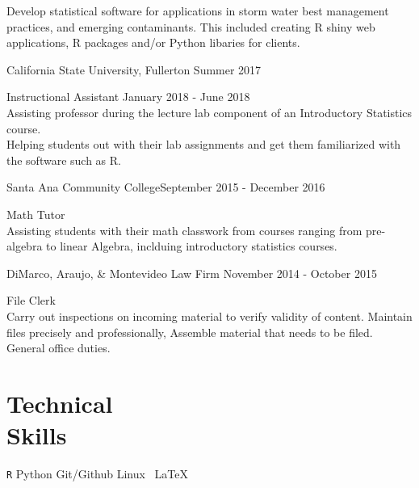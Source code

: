 \documentclass[margin,line]{res}
\newenvironment{list1}{
  \begin{list}{\ding{113}}{
      \setlength{\itemsep}{0in}
      \setlength{\parsep}{0in} \setlength{\parskip}{0in}
      \setlength{\topsep}{0in} \setlength{\partopsep}{0in} 
      \setlength{\leftmargin}{0.20in}}}{\end{list}}
\begin{document}
\begin{resume}
\begin{list1}
Develop statistical software for applications in storm water best management practices, and emerging contaminants. This included creating R shiny web applications, R packages and/or Python libaries for clients.
\end{list1}

{\sc California State University, Fullerton} \hfill {Summer 2017}\\
\vspace*{-.15in}
\begin{list1}
\item[] {\sc Instructional Assistant} \hfill{January 2018 - June 2018} \\
\vskip -6pt
Assisting professor during the lecture lab component of an Introductory Statistics course. \\
Helping students out with their lab assignments and get them familiarized with the software such as R. 

\end{list1}
{\sc Santa Ana Community College}\hfill {September 2015 - December 2016 }\\
\vspace*{-.15in}
\begin{list1}
\item[] {\sc Math Tutor}  \\
\vskip -6pt
Assisting students with their math classwork from courses ranging from pre-algebra to linear Algebra, inclduing introductory statistics courses.
\end{list1}

{\sc DiMarco, Araujo, \& Montevideo Law Firm} \hfill {November 2014 - October 2015}\\
\vspace*{-.15in}
\begin{list1}
\item[]{\sc File Clerk}\\
\vskip -6pt
Carry out inspections on incoming material to verify validity of content. Maintain files precisely and professionally, Assemble material that needs to be filed. General office duties.
\end{list1}

\vspace{1ex}

\section{\sc Technical\\ Skills}
\verb|R|  \hspace{2ex} Python   \hspace{2ex} Git/Github \hspace{2ex}
Linux \hspace{2ex} \, \LaTeX 

\end{resume}
\end{document}
